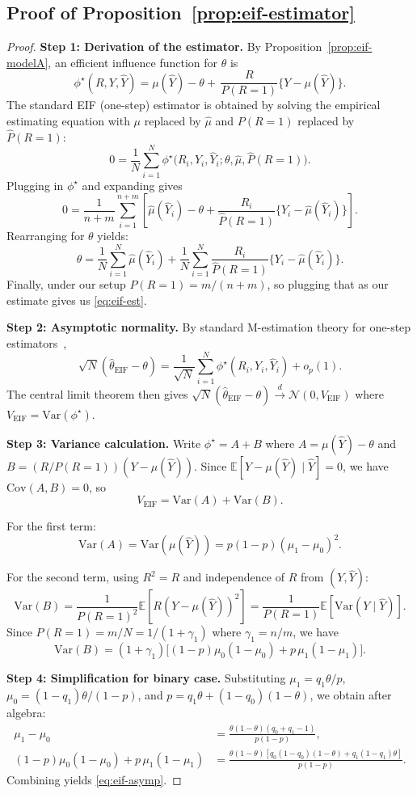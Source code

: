 \subsection{Proof of Proposition~\ref{prop:eif-estimator}}
\begin{proof}
  \textbf{Step 1: Derivation of the estimator.}
By Proposition~\ref{prop:eif-modelA}, an efficient influence function for $\theta$
is
\[
\phi^\star(R,Y,\hat Y)
=
\mu(\hat Y)-\theta
+\,\frac{R}{P(R=1)}\bigl\{Y-\mu(\hat Y)\bigr\}.
\]
The standard EIF (one-step) estimator is obtained by solving the empirical
estimating equation with $\mu$ replaced by $\hat\mu$ and ${P}(R=1)$ replaced by $\hat{P}(R=1)$:
\[
0=\frac{1}{N}\sum_{i=1}^{N}\phi^\star\bigl(R_i,Y_i,\hat Y_i;\theta,\hat\mu,\hat{P}(R=1)\bigr).
\]
Plugging in $\phi^\star$ and expanding gives
\[
0=\frac{1}{n+m}\sum_{i=1}^{n+m}\left[
\hat\mu(\hat Y_i)-\theta
+\frac{R_i}{\hat{P}(R=1)}\{Y_i-\hat\mu(\hat Y_i)\}
\right].
\]
Rearranging for $\theta$ yields:
\[
\theta
=
\frac{1}{N}\sum_{i=1}^{N}\hat\mu(\hat Y_i)
+\frac{1}{N}\sum_{i=1}^{N}\frac{R_i}{\hat{P}(R=1)}\{Y_i-\hat\mu(\hat Y_i)\}.
\]
Finally, under our setup
${P}(R=1)=m/(n+m)$, so plugging that as our estimate gives us \eqref{eq:eif-est}.

\textbf{Step 2: Asymptotic normality.}
  By standard M-estimation theory for one-step estimators~\citep{bickel1993efficient},
  \[
  \sqrt{N}(\hat\theta_{\mathrm{EIF}} - \theta) = \frac{1}{\sqrt{N}}\sum_{i=1}^{N}\phi^\star(R_i,Y_i,\hat Y_i) + o_p(1).
  \]
  The central limit theorem then gives $\sqrt{N}(\hat\theta_{\mathrm{EIF}} - \theta) \xrightarrow{d} \mathcal{N}(0, V_{\mathrm{EIF}})$ where $V_{\mathrm{EIF}} = \mathrm{Var}(\phi^\star)$.

 \textbf{Step 3: Variance calculation.}
  Write $\phi^\star = A + B$ where $A = \mu(\hat Y) - \theta$ and $B = (R/P(R=1))(Y - \mu(\hat Y))$. Since $\mathbb{E}[Y - \mu(\hat Y) \mid \hat Y] = 0$, we have $\mathrm{Cov}(A, B) = 0$, so
  \[
  V_{\mathrm{EIF}} = \mathrm{Var}(A) + \mathrm{Var}(B).
  \]

  For the first term:
  \[
  \mathrm{Var}(A) = \mathrm{Var}(\mu(\hat Y)) = p(1-p)(\mu_1 - \mu_0)^2.
  \]

  For the second term, using $R^2 = R$ and independence of $R$ from $(Y, \hat Y)$:
  \[
  \mathrm{Var}(B) = \frac{1}{P(R=1)^2}\mathbb{E}[R(Y-\mu(\hat Y))^2] = \frac{1}{P(R=1)}\mathbb{E}[\mathrm{Var}(Y \mid \hat Y)].
  \]
  Since $P(R=1) = m/N = 1/(1+\gamma_1)$ where $\gamma_1 = n/m$, we have
  \[
  \mathrm{Var}(B) = (1+\gamma_1)\bigl[(1-p)\mu_0(1-\mu_0) + p\,\mu_1(1-\mu_1)\bigr].
  \]

  \textbf{Step 4: Simplification for binary case.}
  Substituting $\mu_1 = q_1\theta/p$, $\mu_0 = (1-q_1)\theta/(1-p)$, and $p = q_1\theta + (1-q_0)(1-\theta)$, we obtain after algebra:
  \begin{align*}
  \mu_1 - \mu_0 &= \frac{\theta(1-\theta)(q_0+q_1-1)}{p(1-p)}, \\
  (1-p)\mu_0(1-\mu_0) + p\,\mu_1(1-\mu_1) &= \frac{\theta(1-\theta)[q_0(1-q_0)(1-\theta) + q_1(1-q_1)\theta]}{p(1-p)}.
  \end{align*}
  Combining yields \eqref{eq:eif-asymp}.
  \end{proof}

